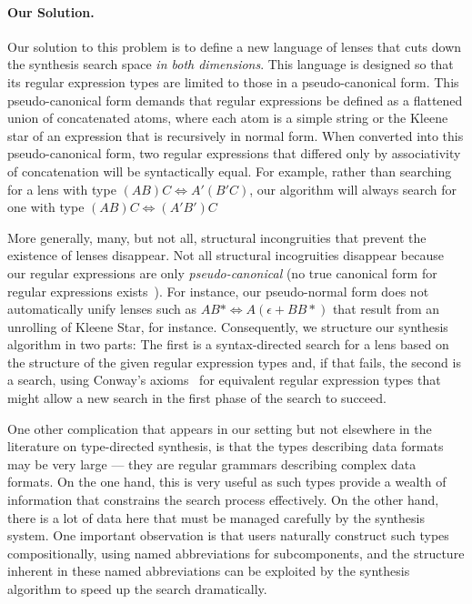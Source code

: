 \paragraph*{Our Solution.}  Our solution to this problem is to define
a new language of lenses that
cuts down the synthesis search space \emph{in both dimensions}.  
This language is designed so that its regular expression types are limited 
to those in a pseudo-canonical form.  This pseudo-canonical form
demands that regular expressions be defined as a flattened 
union of concatenated atoms, where each atom is a simple string or
the Kleene star of an expression that is recursively in normal form.
When converted into this pseudo-canonical form, two regular expressions that 
differed only by associativity of concatenation will be syntactically equal.
For example, rather than searching for a lens with type 
 $(A B) C \Leftrightarrow A' (B' C)$, our algorithm will always search
for one with type  $(A B) C \Leftrightarrow (A' B') C$
  
More generally, many, but not all, structural incongruities that
prevent the existence of lenses disappear.
Not all structural incogruities disappear because our regular expressions
are only \emph{pseudo-canonical} (no true canonical form for regular
expressions exists~\cite{?}).  For instance, our pseudo-normal form
does not automatically unify lenses such as
$A B* \Leftrightarrow A (\epsilon + BB*)$ that result from an
unrolling of Kleene Star, for instance.
Consequently, we structure our synthesis algorithm in two parts:  The
first is a syntax-directed search for a lens based on the structure of the given
regular expression types and, if that fails, the second is a search,
using Conway's axioms~\cite{conway} for 
equivalent regular expression types that might allow a new search
in the first phase of the search to succeed.  

One other complication that appears in our setting but not elsewhere in
the literature on type-directed synthesis, is that the types 
describing data formats may be very large --- they are regular
grammars describing complex data formats.  On the one hand, this is
very useful as such types provide a wealth of information that constrains
the search process effectively.  On the other hand, there is a lot of
data here that must be managed carefully by the synthesis system.
One important observation is that users naturally construct
such types compositionally, using named abbreviations for subcomponents,
and the structure inherent in these named abbreviations can be 
exploited by the synthesis algorithm to speed up the search dramatically.

